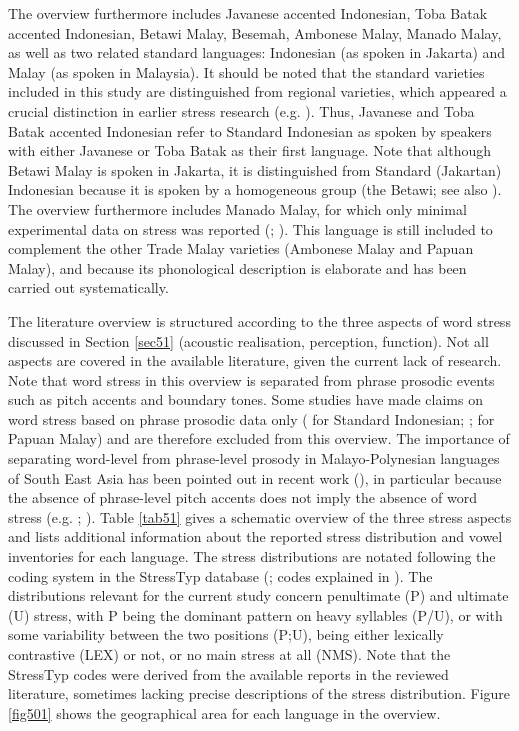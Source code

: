 The overview furthermore includes Javanese accented Indonesian, Toba Batak accented Indonesian, Betawi Malay, Besemah, Ambonese Malay, Manado Malay, as well as two related standard languages: Indonesian (as spoken in Jakarta) and Malay (as spoken in Malaysia). It should be noted that the standard varieties included in this study are distinguished from regional varieties, which appeared a crucial distinction in earlier stress research (e.g. \citealt{goedemans_stress_2007}). Thus, Javanese and Toba Batak accented Indonesian refer to Standard Indonesian as spoken by speakers with either Javanese or Toba Batak as their first language. Note that although Betawi Malay is spoken in Jakarta, it is distinguished from Standard (Jakartan) Indonesian because it is spoken by a homogeneous group (the Betawi; see also \citealt{vanheuven_betawi_2008}). The overview furthermore includes Manado Malay, for which only minimal experimental data on stress was reported (\citealt{stoel_focus_2005}; \citealt{stoel_intonation_2007}). This language is still included to complement the other Trade Malay varieties (Ambonese Malay and Papuan Malay), and because its phonological description is elaborate and has been carried out systematically. \par

The literature overview is structured according to the three aspects of word stress discussed in Section \ref{sec51} (acoustic realisation, perception, function). Not all aspects are covered in the available literature, given the current lack of research. Note that word stress in this overview is separated from phrase prosodic events such as pitch accents and boundary tones. Some studies have made claims on word stress based on phrase prosodic data only (\citealt{ode_perception_1994} for Standard Indonesian; \citealt{riesberg_perception_2018}; \citealt{riesberg_using_2020} for Papuan Malay) and are therefore excluded from this overview. The importance of separating word-level from phrase-level prosody in Malayo-Polynesian languages of South East Asia has been pointed out in recent work (\citealt[12]{kaufman_suprasegmental_2024}), in particular because the absence of phrase-level pitch accents does not imply the absence of word stress (e.g. \citealt{gordon_disentangling_2014}; \citealt{lindstrom_aspects_2005}). Table \ref{tab51} gives a schematic overview of the three stress aspects and lists additional information about the reported stress distribution and vowel inventories for each language. The stress distributions are notated following the coding system in the StressTyp database (\citealt{goedemans_stresstyp2_2020}; codes explained in \citealt{hulst_survey_2010}). The distributions relevant for the current study concern penultimate (P) and ultimate (U) stress, with P being the dominant pattern on heavy syllables (P/U), or with some variability between the two positions (P;U), being either lexically contrastive (LEX) or not, or no main stress at all (NMS). Note that the StressTyp codes were derived from the available reports in the reviewed literature, sometimes lacking precise descriptions of the stress distribution. Figure \ref{fig501} shows the geographical area for each language in the overview. \par

